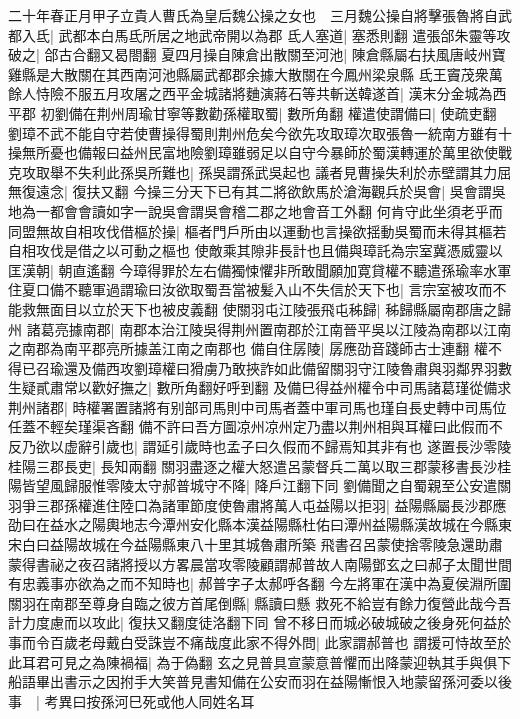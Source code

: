 二十年春正月甲子立貴人曹氏為皇后魏公操之女也　三月魏公操自將擊張魯將自武都入氐|{
	武都本白馬氐所居之地武帝開以為郡}
氐人塞道|{
	塞悉則翻}
遣張郃朱靈等攻破之|{
	郃古合翻又曷閤翻}
夏四月操自陳倉出散關至河池|{
	陳倉縣屬右扶風唐岐州寶雞縣是大散關在其西南河池縣屬武都郡余據大散關在今鳳州梁泉縣}
氐王竇茂衆萬餘人恃險不服五月攻屠之西平金城諸將麯演蔣石等共斬送韓遂首|{
	漢末分金城為西平郡}
初劉備在荆州周瑜甘寧等數勸孫權取蜀|{
	數所角翻}
權遣使謂備曰|{
	使疏吏翻}
劉璋不武不能自守若使曹操得蜀則荆州危矣今欲先攻取璋次取張魯一統南方雖有十操無所憂也備報曰益州民富地險劉璋雖弱足以自守今暴師於蜀漢轉運於萬里欲使戰克攻取舉不失利此孫吳所難也|{
	孫吳謂孫武吳起也}
議者見曹操失利於赤壁謂其力屈無復遠念|{
	復扶又翻}
今操三分天下已有其二將欲飲馬於滄海觀兵於吳會|{
	吳會謂吳地為一都會會讀如字一說吳會謂吳會稽二郡之地會音工外翻}
何肯守此坐須老乎而同盟無故自相攻伐借樞於操|{
	樞者門戶所由以運動也言操欲揺動吳蜀而未得其樞若自相攻伐是借之以可動之樞也}
使敵乘其隙非長計也且備與璋託為宗室冀憑威靈以匡漢朝|{
	朝直遙翻}
今璋得罪於左右備獨悚懼非所敢聞願加寛貸權不聽遣孫瑜率水軍住夏口備不聽軍過謂瑜曰汝欲取蜀吾當被髪入山不失信於天下也|{
	言宗室被攻而不能救無面目以立於天下也被皮義翻}
使關羽屯江陵張飛屯秭歸|{
	秭歸縣屬南郡唐之歸州}
諸葛亮據南郡|{
	南郡本治江陵吳得荆州置南郡於江南晉平吳以江陵為南郡以江南之南郡為南平郡亮所據盖江南之南郡也}
備自住孱陵|{
	孱應劭音踐師古士連翻}
權不得已召瑜還及備西攻劉璋權曰猾虜乃敢挾詐如此備留關羽守江陵魯肅與羽鄰界羽數生疑貳肅常以歡好撫之|{
	數所角翻好呼到翻}
及備巳得益州權令中司馬諸葛瑾從備求荆州諸郡|{
	時權署置諸將有别部司馬則中司馬者蓋中軍司馬也瑾自長史轉中司馬位任蓋不輕矣瑾渠吝翻}
備不許曰吾方圖凉州凉州定乃盡以荆州相與耳權曰此假而不反乃欲以虚辭引歲也|{
	謂延引歲時也孟子曰久假而不歸焉知其非有也}
遂置長沙零陵桂陽三郡長吏|{
	長知兩翻}
關羽盡逐之權大怒遣呂蒙督兵二萬以取三郡蒙移書長沙桂陽皆望風歸服惟零陵太守郝普城守不降|{
	降戶江翻下同}
劉備聞之自蜀親至公安遣關羽爭三郡孫權進住陸口為諸軍節度使魯肅將萬人屯益陽以拒羽|{
	益陽縣屬長沙郡應劭曰在益水之陽輿地志今潭州安化縣本漢益陽縣杜佑曰潭州益陽縣漢故城在今縣東宋白曰益陽故城在今益陽縣東八十里其城魯肅所築}
飛書召呂蒙使捨零陵急還助肅蒙得書祕之夜召諸將授以方畧晨當攻零陵顧謂郝普故人南陽鄧玄之曰郝子太聞世間有忠義事亦欲為之而不知時也|{
	郝普字子太郝呼各翻}
今左將軍在漢中為夏侯淵所圍關羽在南郡至尊身自臨之彼方首尾倒縣|{
	縣讀曰懸}
救死不給豈有餘力復營此哉今吾計力度慮而以攻此|{
	復扶又翻度徒洛翻下同}
曾不移日而城必破城破之後身死何益於事而令百歲老母戴白受誅豈不痛哉度此家不得外問|{
	此家謂郝普也}
謂援可恃故至於此耳君可見之為陳禍福|{
	為于偽翻}
玄之見普具宣蒙意普懼而出降蒙迎執其手與俱下船語畢出書示之因拊手大笑普見書知備在公安而羽在益陽慚恨入地蒙留孫河委以後事　|{
	考異曰按孫河巳死或他人同姓名耳}
